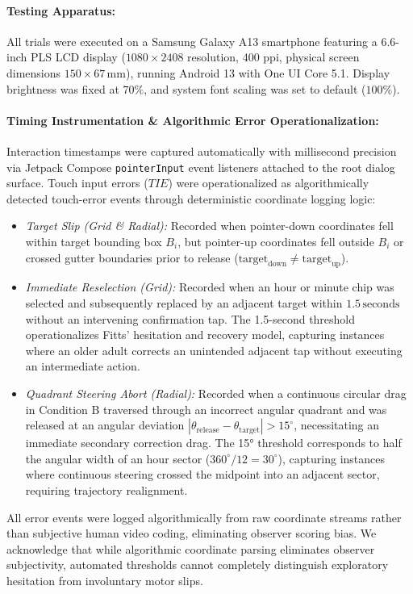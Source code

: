 \documentclass[11pt,a4paper]{article}
\begin{document}
\paragraph{Testing Apparatus:} All trials were executed on a Samsung Galaxy A13 smartphone featuring a 6.6-inch PLS LCD display ($1080 \times 2408$ resolution, 400 ppi, physical screen dimensions $150 \times 67\,\text{mm}$), running Android 13 with One UI Core 5.1. Display brightness was fixed at $70\%$, and system font scaling was set to default ($100\%$).

\paragraph{Timing Instrumentation \& Algorithmic Error Operationalization:} Interaction timestamps were captured automatically with millisecond precision via Jetpack Compose \texttt{pointerInput} event listeners attached to the root dialog surface. Touch input errors ($TIE$) were operationalized as algorithmically detected touch-error events through deterministic coordinate logging logic:
\begin{itemize}[leftmargin=*]
    \item \emph{Target Slip (Grid \& Radial):} Recorded when pointer-down coordinates fell within target bounding box $B_i$, but pointer-up coordinates fell outside $B_i$ or crossed gutter boundaries prior to release ($\text{target}_{\text{down}} \ne \text{target}_{\text{up}}$).
    \item \emph{Immediate Reselection (Grid):} Recorded when an hour or minute chip was selected and subsequently replaced by an adjacent target within $1.5\,\text{seconds}$ without an intervening confirmation tap. The 1.5-second threshold operationalizes Fitts' hesitation and recovery model, capturing instances where an older adult corrects an unintended adjacent tap without executing an intermediate action.
    \item \emph{Quadrant Steering Abort (Radial):} Recorded when a continuous circular drag in Condition B traversed through an incorrect angular quadrant and was released at an angular deviation $|\theta_{\text{release}} - \theta_{\text{target}}| > 15^\circ$, necessitating an immediate secondary correction drag. The 15° threshold corresponds to half the angular width of an hour sector ($360^\circ / 12 = 30^\circ$), capturing instances where continuous steering crossed the midpoint into an adjacent sector, requiring trajectory realignment.
\end{itemize}
All error events were logged algorithmically from raw coordinate streams rather than subjective human video coding, eliminating observer scoring bias. We acknowledge that while algorithmic coordinate parsing eliminates observer subjectivity, automated thresholds cannot completely distinguish exploratory hesitation from involuntary motor slips.
\end{document}
